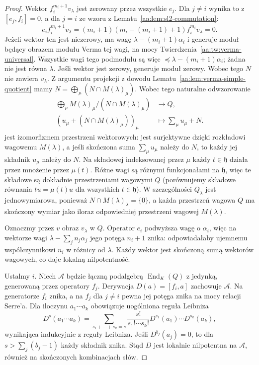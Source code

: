 \begin{proof}
Wektor $f_i^{m_i+1}v_\lambda$ jest zerowany przez wszystkie $e_j$. Dla $j\ne i$ wynika to z $[e_j,f_i]=0$, a dla $j=i$ ze wzoru z Lematu~\ref{aa:lem:sl2-commutation}:
\[
 e_i f_i^{m_i+1}v_\lambda
 =(m_i+1)(m_i-(m_i+1)+1)f_i^{m_i}v_\lambda=0.
\]
Jeżeli wektor ten jest niezerowy, ma wagę $\lambda-(m_i+1)\alpha_i$ i generuje moduł będący obrazem modułu Verma tej wagi, na mocy Twierdzenia~\ref{aa:tw:verma-universal}. Wszystkie wagi tego podmodułu są więc $\preceq\lambda-(m_i+1)\alpha_i$; żadna nie jest równa $\lambda$. Jeśli wektor jest zerowy, generuje moduł zerowy. Wobec tego $N$ nie zawiera $v_\lambda$. Z argumentu projekcji z dowodu Lematu~\ref{aa:lem:verma-simple-quotient} mamy $N=\bigoplus_\mu(N\cap M(\lambda)_\mu)$. Wobec tego naturalne odwzorowanie
\[
 \begin{aligned}
 \bigoplus_\mu M(\lambda)_\mu/(N\cap M(\lambda)_\mu)
 &\longrightarrow Q,\\
 (u_\mu+(N\cap M(\lambda)_\mu))_\mu
 &\longmapsto \sum_\mu u_\mu+N.
 \end{aligned}
\]
jest izomorfizmem przestrzeni wektorowych: jest surjektywne dzięki rozkładowi wagowemu $M(\lambda)$, a jeśli skończona suma $\sum_\mu u_\mu$ należy do $N$, to każdy jej składnik $u_\mu$ należy do $N$. Na składowej indeksowanej przez $\mu$ każdy $t\in\mathfrak h$ działa przez mnożenie przez $\mu(t)$. Różne wagi są różnymi funkcjonałami na $\mathfrak h$, więc te składowe są dokładnie przestrzeniami wagowymi $Q$ (porównujemy składowe równania $tu=\mu(t)u$ dla wszystkich $t\in\mathfrak h$). W szczególności $Q_\lambda$ jest jednowymiarowa, ponieważ $N\cap M(\lambda)_\lambda=\{0\}$, a każda przestrzeń wagowa $Q$ ma skończony wymiar jako iloraz odpowiedniej przestrzeni wagowej $M(\lambda)$.

Oznaczmy przez $v$ obraz $v_\lambda$ w $Q$. Operator $e_i$ podwyższa wagę o $\alpha_i$, więc na wektorze wagi $\lambda-\sum_j n_j\alpha_j$ jego potęga $n_i+1$ znika: odpowiadałaby ujemnemu współczynnikowi $n_i$ w różnicy od $\lambda$. Każdy wektor jest skończoną sumą wektorów wagowych, co daje lokalną nilpotentność.

Ustalmy $i$. Niech $\mathcal A$ będzie łączną podalgebrą $\operatorname{End}_K(Q)$ z jedynką, generowaną przez operatory $f_j$. Derywacja $D(a)=[f_i,a]$ zachowuje $\mathcal A$. Na generatorze $f_i$ znika, a na $f_j$ dla $j\ne i$ pewna jej potęga znika na mocy relacji Serre'a. Dla iloczynu $a_1\cdots a_k$ obowiązuje uogólniona reguła Leibniza
\[
 D^s(a_1\cdots a_k)
 =\sum_{s_1+\cdots+s_k=s}
 \frac{s!}{s_1!\cdots s_k!}D^{s_1}(a_1)\cdots D^{s_k}(a_k),
\]
wynikająca indukcyjnie z reguły Leibniza. Jeśli $D^{b_j}(a_j)=0$, to dla $s>\sum_j(b_j-1)$ każdy składnik znika. Stąd $D$ jest lokalnie nilpotentna na $\mathcal A$, również na skończonych kombinacjach słów.


\end{proof}
